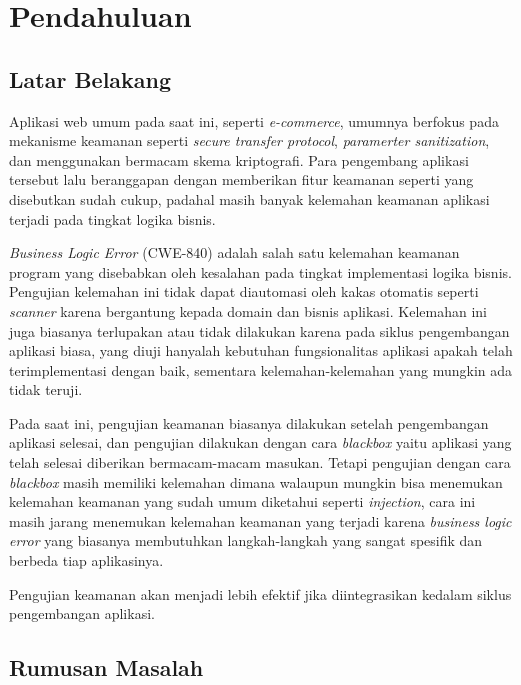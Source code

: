 \chapter{Pendahuluan}

\section{Latar Belakang}

Aplikasi web umum pada saat ini, seperti \textit{e-commerce}, umumnya berfokus pada mekanisme keamanan
seperti \textit{secure transfer protocol}, \textit{paramerter sanitization}, dan menggunakan bermacam skema
kriptografi. Para pengembang aplikasi tersebut lalu beranggapan dengan memberikan fitur keamanan seperti yang
disebutkan sudah cukup, padahal masih banyak kelemahan keamanan aplikasi terjadi pada
tingkat logika bisnis.

\textit{Business Logic Error} (CWE-840) adalah salah satu kelemahan keamanan program yang disebabkan oleh kesalahan pada
tingkat implementasi logika bisnis.
Pengujian kelemahan ini tidak dapat diautomasi oleh kakas otomatis seperti \textit{scanner}
karena bergantung kepada domain dan bisnis aplikasi.
Kelemahan ini juga biasanya terlupakan atau tidak dilakukan karena pada siklus pengembangan aplikasi biasa,
yang diuji hanyalah kebutuhan fungsionalitas aplikasi apakah telah
terimplementasi dengan baik, sementara kelemahan-kelemahan yang mungkin ada tidak teruji.

Pada saat ini, pengujian keamanan biasanya dilakukan setelah pengembangan aplikasi selesai, dan pengujian
dilakukan dengan cara \textit{blackbox} yaitu aplikasi yang telah selesai diberikan bermacam-macam masukan.
Tetapi pengujian dengan cara \textit{blackbox} masih memiliki kelemahan dimana walaupun mungkin bisa menemukan
kelemahan keamanan yang sudah umum diketahui seperti \textit{injection}, cara ini masih jarang menemukan
kelemahan keamanan yang terjadi karena \textit{business logic error} yang biasanya membutuhkan
langkah-langkah yang sangat spesifik dan berbeda tiap aplikasinya.

Pengujian keamanan akan menjadi lebih efektif jika diintegrasikan kedalam siklus pengembangan aplikasi.

\section{Rumusan Masalah}

